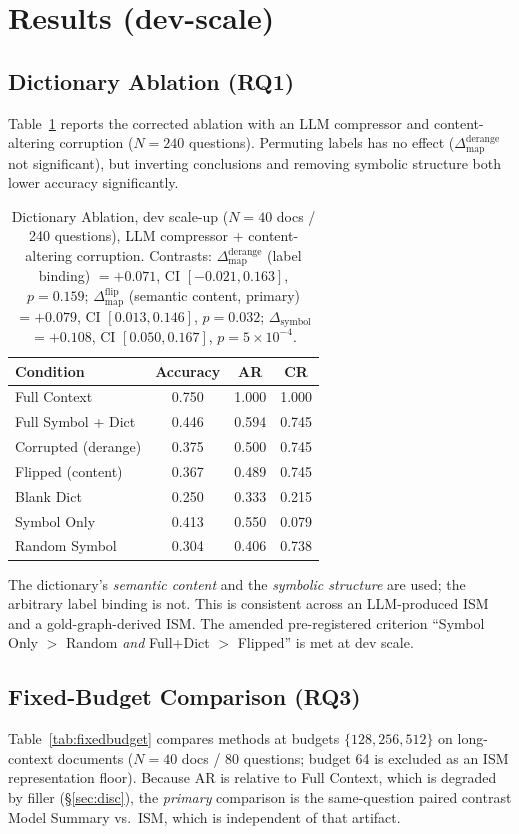 \documentclass{article}
\newcommand{\dmapder}{\ensuremath{\Delta_{\mathrm{map}}^{\mathrm{derange}}}}
\newcommand{\dmapflip}{\ensuremath{\Delta_{\mathrm{map}}^{\mathrm{flip}}}}
\newcommand{\dsym}{\ensuremath{\Delta_{\mathrm{symbol}}}}
\begin{document}
\section{Results (dev-scale)}

\subsection{Dictionary Ablation (RQ1)}
Table~\ref{tab:ablation} reports the corrected ablation with an LLM compressor and
content-altering corruption (\(N=240\) questions). Permuting labels has no effect
(\dmapder{} not significant), but inverting conclusions and removing symbolic
structure both lower accuracy significantly.

\begin{table}[t]
\centering
\caption{Dictionary Ablation, dev scale-up (\(N{=}40\) docs / 240 questions),
LLM compressor + content-altering corruption. Contrasts: \dmapder{} (label
binding) $=+0.071$, CI $[-0.021,0.163]$, $p{=}0.159$; \dmapflip{} (semantic
content, primary) $=+0.079$, CI $[0.013,0.146]$, $p{=}0.032$; \dsym{} $=+0.108$,
CI $[0.050,0.167]$, $p{=}5\!\times\!10^{-4}$.}
\label{tab:ablation}
\begin{tabular}{lccc}
\toprule
Condition & Accuracy & AR & CR \\
\midrule
Full Context        & 0.750 & 1.000 & 1.000 \\
Full Symbol + Dict  & 0.446 & 0.594 & 0.745 \\
Corrupted (derange) & 0.375 & 0.500 & 0.745 \\
Flipped (content)   & 0.367 & 0.489 & 0.745 \\
Blank Dict          & 0.250 & 0.333 & 0.215 \\
Symbol Only         & 0.413 & 0.550 & 0.079 \\
Random Symbol       & 0.304 & 0.406 & 0.738 \\
\bottomrule
\end{tabular}
\end{table}

The dictionary's \emph{semantic content} and the \emph{symbolic structure} are
used; the arbitrary label binding is not. This is consistent across an LLM-produced
ISM and a gold-graph-derived ISM. The amended pre-registered criterion
``Symbol Only $>$ Random \emph{and} Full+Dict $>$ Flipped'' is met at dev scale.

\subsection{Fixed-Budget Comparison (RQ3)}
\label{sec:fixedbudget}
Table~\ref{tab:fixedbudget} compares methods at budgets $\{128,256,512\}$ on
long-context documents (\(N=40\) docs / 80 questions; budget 64 is excluded as an
ISM representation floor). Because AR is relative to Full Context, which is
degraded by filler (\S\ref{sec:disc}), the \emph{primary} comparison is the
same-question paired contrast Model Summary vs.\ ISM, which is independent of that
artifact.
\end{document}
